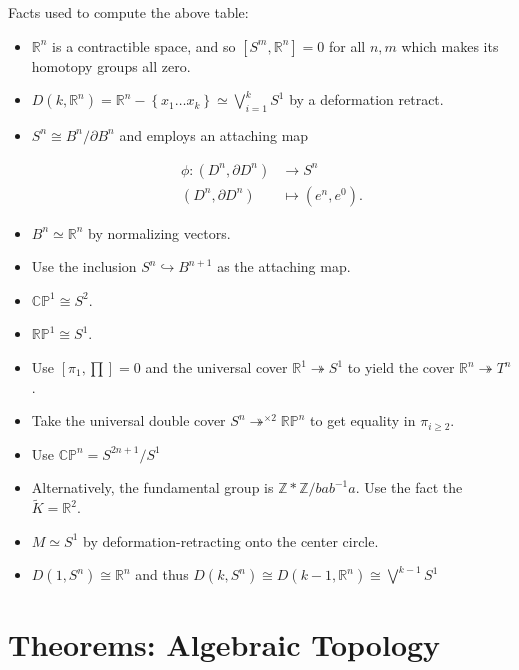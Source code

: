 \normalsize

Facts used to compute the above table:

\begin{itemize}
\item
  \({\mathbb{R}}^n\) is a contractible space, and so
  \([S^m, {\mathbb{R}}^n] = 0\) for all \(n, m\) which makes its
  homotopy groups all zero.
\item
  \(D(k, {\mathbb{R}}^n) = {\mathbb{R}}^n - \left\{{x_1 \ldots x_k}\right\} \simeq\bigvee_{i=1}^k S^1\)
  by a deformation retract.
\item
  \(S^n \cong B^n / {\partial}B^n\) and employs an attaching map

  \begin{align*} \phi: (D^n, {\partial}D^n) &\to S^n \\  (D^n, {\partial}D^n) &\mapsto (e^n, e^0) .\end{align*}
\item
  \(B^n \simeq{\mathbb{R}}^n\) by normalizing vectors.
\item
  Use the inclusion \(S^n \hookrightarrow B^{n+1}\) as the attaching
  map.
\item
  \({\mathbb{CP}}^1 \cong S^2\).
\item
  \({\mathbb{RP}}^1 \cong S^1\).
\item
  Use \(\left[ \pi_1, \prod \right]= 0\) and the universal cover
  \({\mathbb{R}}^1 \twoheadrightarrow S^1\) to yield the cover
  \({\mathbb{R}}^n \twoheadrightarrow T^n\).
\item
  Take the universal double cover
  \(S^n \twoheadrightarrow^{\times 2} {\mathbb{RP}}^n\) to get equality
  in \(\pi_{i\geq 2}\).
\item
  Use \({\mathbb{CP}}^n = S^{2n+1} / S^1\)
\item
  Alternatively, the fundamental group is
  \({\mathbb{Z}}\ast{\mathbb{Z}}/ bab^{-1}a\). Use the fact the
  \(\tilde K = {\mathbb{R}}^2\).
\item
  \(M \simeq S^1\) by deformation-retracting onto the center circle.
\item
  \(D(1, S^n) \cong {\mathbb{R}}^n\) and thus
  \(D(k, S^n) \cong D(k-1, {\mathbb{R}}^n) \cong \bigvee^{k-1} S^1\)
\end{itemize}

\hypertarget{theorems-algebraic-topology}{%
\section{Theorems: Algebraic
Topology}\label{theorems-algebraic-topology}}

